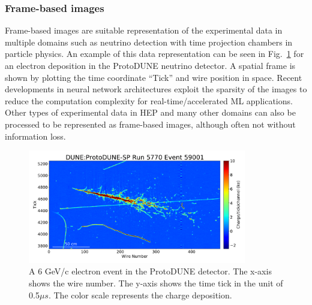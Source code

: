 \subsubsection{Frame-based images}
Frame-based images are suitable representation of the experimental data in multiple domains such as neutrino detection with time projection chambers in particle physics. An example of this data representation can be seen in Fig.~\ref{fig:repframe} for an electron deposition in the ProtoDUNE neutrino detector.  
A spatial frame is shown by plotting the time coordinate ``Tick'' and wire position in space. Recent developments in neural network architectures exploit the sparsity of the images to reduce the computation complexity for real-time/accelerated ML applications. Other types of experimental data in HEP and many other domains can also be processed to be represented as frame-based images, although often not without information loss. 
\begin{figure}[tbh!]
    \centering
    \includegraphics[width = 0.85\textwidth]{figures/R5770_E59001_T1T5T9_w0_480_t3750_5250_sc15.pdf}
    \caption{A 6 GeV/c electron event in the ProtoDUNE detector. The x-axis shows the wire number. The y-axis shows the time tick in the unit of 0.5$\mu s$. The color scale represents the charge deposition.\cite{}}
    \label{fig:repframe}
\end{figure}

